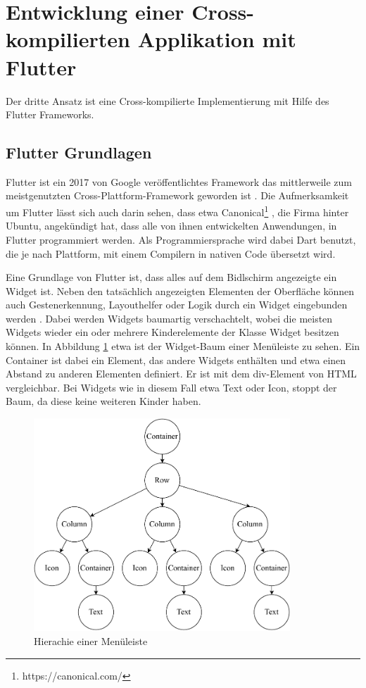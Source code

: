 \section{Entwicklung einer Cross-kompilierten Applikation mit Flutter}
Der dritte Ansatz ist eine Cross-kompilierte Implementierung mit Hilfe des Flutter Frameworks.

\subsection{Flutter Grundlagen}
Flutter ist ein 2017 von Google veröffentlichtes Framework das mittlerweile zum meistgenutzten Cross-Plattform-Framework geworden ist \cite{statist_CP_Framework}. Die Aufmerksamkeit um Flutter lässt sich auch darin sehen, dass etwa Canonical\footnote{https://canonical.com/} , die Firma hinter Ubuntu, angekündigt hat, dass alle von ihnen entwickelten Anwendungen, in Flutter programmiert werden\cite{Ubuntu_Flutter}. Als Programmiersprache wird dabei Dart benutzt, die je nach Plattform, mit einem Compilern in nativen Code übersetzt wird.

Eine Grundlage von Flutter ist, dass alles auf dem Bidlschirm angezeigte ein Widget ist. Neben den tatsächlich angezeigten Elementen der Oberfläche können auch Gestenerkennung, Layouthelfer oder Logik durch ein Widget eingebunden werden \cite{Thiele_2018}. Dabei werden Widgets baumartig verschachtelt, wobei die meisten Widgets wieder ein oder mehrere Kinderelemente der Klasse Widget besitzen können. In Abbildung \ref{fig:flutter_layout_tree} etwa ist der Widget-Baum einer Menüleiste zu sehen. Ein Container ist dabei ein Element, das andere Widgets enthälten und etwa einen Abstand zu anderen Elementen definiert. Er ist mit dem div-Element von HTML vergleichbar. Bei Widgets wie in diesem Fall etwa Text oder Icon, stoppt der Baum, da diese keine weiteren Kinder haben.

\begin{figure}[ht]
  \centering
  \includegraphics[height=8cm,keepaspectratio]{images/Flutter_menu_replacement.drawio.pdf} 
  \caption[Hierachie einer Menüleiste]{Hierachie einer Menüleiste\protect\footnotemark}
  \label{fig:flutter_layout_tree}
\end{figure}

